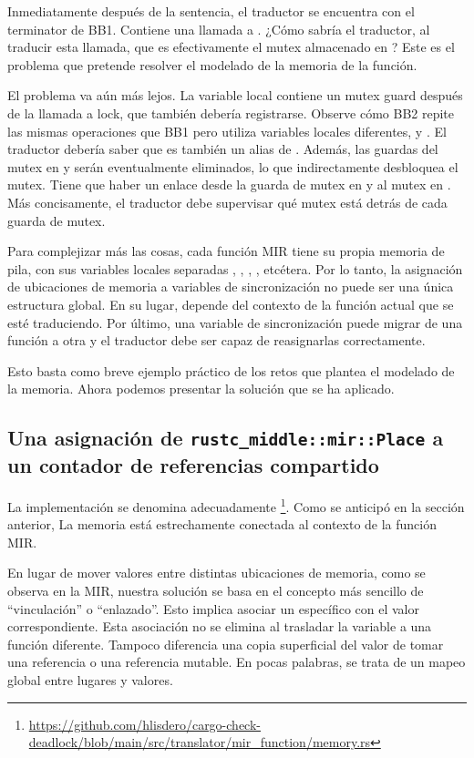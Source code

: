 Inmediatamente después de la sentencia, el traductor se encuentra con el terminator de BB1.
Contiene una llamada a . ¿Cómo sabría el traductor, al traducir esta
llamada, que  es efectivamente el mutex almacenado en ? Este es el problema que
pretende resolver el modelado de la memoria de la función.

El problema va aún más lejos. La variable local  contiene un mutex guard después de la
llamada a lock, que también debería registrarse. Observe cómo BB2 repite las mismas
operaciones que BB1 pero utiliza variables locales diferentes,  y . El traductor debería
saber que  es también un alias de . Además, las guardas del mutex en  y  serán
eventualmente eliminados, lo que indirectamente desbloquea el mutex. Tiene que haber un
enlace desde la guarda de mutex en  y  al mutex en
. Más concisamente, el traductor debe supervisar qué mutex está detrás de cada guarda de mutex.

Para complejizar más las cosas, cada función MIR tiene su propia memoria de pila, con sus
variables locales separadas , ,
, , etcétera. Por lo tanto, la asignación de ubicaciones de
memoria a variables de sincronización no puede ser una única estructura global. En su lugar,
depende del contexto de la función actual que se esté traduciendo. Por último, una variable de
sincronización puede migrar de una función a otra y el traductor debe ser capaz de reasignarlas
correctamente.

Esto basta como breve ejemplo práctico de los retos que plantea el modelado de la memoria.
Ahora podemos presentar la solución que se ha aplicado.

\subsection{Una asignación de \texttt{rustc\_middle::mir::Place} a un contador de referencias compartido}

La implementación se denomina adecuadamente
\footnote{\url{https://github.com/hlisdero/cargo-check-deadlock/blob/main/src/translator/mir_function/memory.rs}}.
Como se anticipó en la sección anterior,
La memoria está estrechamente conectada
al contexto de la función \acrshort{MIR}.

En lugar de mover valores entre distintas ubicaciones de memoria, como se observa en la \acrshort{MIR},
nuestra solución se basa en el concepto más sencillo de ``vinculación'' o ``enlazado''. Esto implica asociar un
 específico con el valor correspondiente. Esta asociación no se elimina
al trasladar la variable a una función diferente. Tampoco diferencia una copia superficial del
valor de tomar una referencia o una referencia mutable. En pocas palabras, se trata de un
mapeo global entre lugares y valores.

